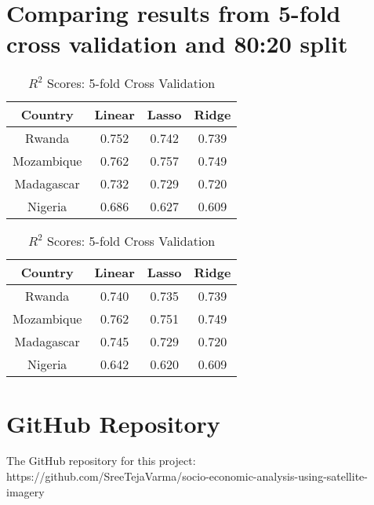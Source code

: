 \section{Comparing results from 5-fold cross validation and 80:20 split}

\begin{table}[h!]
 \caption{\(R^2\) Scores: 5-fold Cross Validation}
 \label{tab:10} 
\begin{center}
\begin{tabular}{|c|c|c|c|}
\hline
Country & Linear & Lasso & Ridge   \\
\hline\hline
Rwanda &  0.752 &  0.742 & 0.739 \\
Mozambique &0.762 & 0.757 & 0.749 \\
Madagascar & 0.732 & 0.729 & 0.720\\
Nigeria & 0.686 & 0.627 & 0.609\\
\hline\hline
\end{tabular}
\end{center}
\end{table}

\begin{table}[h!]
 \caption{\(R^2\) Scores: 5-fold Cross Validation}
 \label{tab:10} 
\begin{center}
\begin{tabular}{|c|c|c|c|}
\hline
Country & Linear & Lasso & Ridge   \\
\hline\hline
Rwanda &   0.740 &  0.735& 0.739 \\
Mozambique &0.762 & 0.751 & 0.749 \\
Madagascar &0.745 & 0.729 & 0.720\\
Nigeria & 0.642 & 0.620 & 0.609\\
\hline\hline
\end{tabular}
\end{center}
\end{table}













\section{GitHub Repository}
The GitHub repository for this project:
\newline
https://github.com/SreeTejaVarma/socio-economic-analysis-using-satellite-imagery